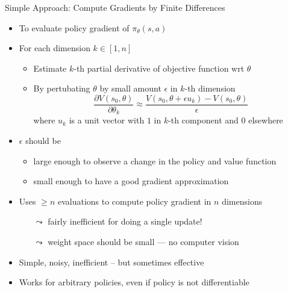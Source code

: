 \documentclass[aspectratio=169]{../latex_main/tntbeamer}  %
\begin{document}
\begin{frame}[c]{Simple Approach: Compute Gradients by Finite Differences}
	
	\begin{itemize}
		\item To evaluate policy gradient of $\pi_\theta(s,a)$
		\item For each dimension $k\in [1,n]$
		\begin{itemize}
			\item Estimate $k$-th partial derivative of objective function wrt $\theta$
			\item By pertubating $\theta$ by small amount $\epsilon$ in $k$-th dimension
			$$\frac{\partial V(s_0, \theta)}{\partial \theta_k} \approx \frac{V(s_0, \theta + \epsilon u_k) - V(s_0, \theta)}{\epsilon} $$
			where $u_k$ is a unit vector with $1$ in $k$-th component and $0$ elsewhere
		\end{itemize}
		\pause
		\item $\epsilon$ should be
		\begin{itemize}
			\item large enough to observe a change in the policy and value function
			\item small enough to have a good gradient approximation
		\end{itemize}
		\pause
		\item Uses $\geq n$ evaluations to compute policy gradient in $n$ dimensions
		\begin{itemize}
			\item[$\leadsto$] fairly inefficient for doing a single update!
			\item[$\leadsto$] weight space should be small --- no computer vision
		\end{itemize}
		\pause
		\item Simple, noisy, inefficient -- but sometimes effective
		\item Works for arbitrary policies, even if policy is not differentiable
	\end{itemize}
	
\end{frame}
\end{document}
